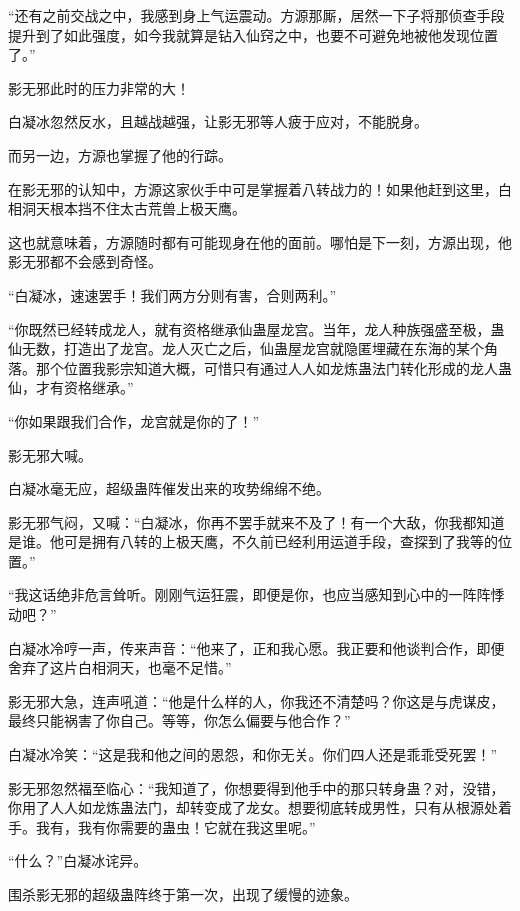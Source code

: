 \begin{this_body}
“还有之前交战之中，我感到身上气运震动。方源那厮，居然一下子将那侦查手段提升到了如此强度，如今我就算是钻入仙窍之中，也要不可避免地被他发现位置了。”

影无邪此时的压力非常的大！

白凝冰忽然反水，且越战越强，让影无邪等人疲于应对，不能脱身。

而另一边，方源也掌握了他的行踪。

在影无邪的认知中，方源这家伙手中可是掌握着八转战力的！如果他赶到这里，白相洞天根本挡不住太古荒兽上极天鹰。

这也就意味着，方源随时都有可能现身在他的面前。哪怕是下一刻，方源出现，他影无邪都不会感到奇怪。

“白凝冰，速速罢手！我们两方分则有害，合则两利。”

“你既然已经转成龙人，就有资格继承仙蛊屋龙宫。当年，龙人种族强盛至极，蛊仙无数，打造出了龙宫。龙人灭亡之后，仙蛊屋龙宫就隐匿埋藏在东海的某个角落。那个位置我影宗知道大概，可惜只有通过人人如龙炼蛊法门转化形成的龙人蛊仙，才有资格继承。”

“你如果跟我们合作，龙宫就是你的了！”

影无邪大喊。

白凝冰毫无应，超级蛊阵催发出来的攻势绵绵不绝。

影无邪气闷，又喊：“白凝冰，你再不罢手就来不及了！有一个大敌，你我都知道是谁。他可是拥有八转的上极天鹰，不久前已经利用运道手段，查探到了我等的位置。”

“我这话绝非危言耸听。刚刚气运狂震，即便是你，也应当感知到心中的一阵阵悸动吧？”

白凝冰冷哼一声，传来声音：“他来了，正和我心愿。我正要和他谈判合作，即便舍弃了这片白相洞天，也毫不足惜。”

影无邪大急，连声吼道：“他是什么样的人，你我还不清楚吗？你这是与虎谋皮，最终只能祸害了你自己。等等，你怎么偏要与他合作？”

白凝冰冷笑：“这是我和他之间的恩怨，和你无关。你们四人还是乖乖受死罢！”

影无邪忽然福至临心：“我知道了，你想要得到他手中的那只转身蛊？对，没错，你用了人人如龙炼蛊法门，却转变成了龙女。想要彻底转成男性，只有从根源处着手。我有，我有你需要的蛊虫！它就在我这里呢。”

“什么？”白凝冰诧异。

围杀影无邪的超级蛊阵终于第一次，出现了缓慢的迹象。

\end{this_body}

